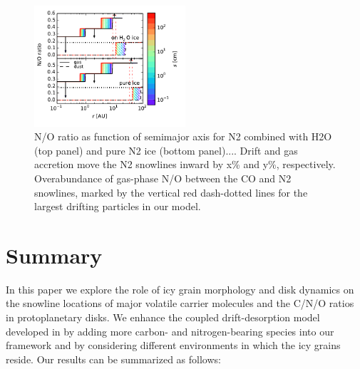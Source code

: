 \documentclass[apj]{emulateapj}
\newcommand{\emgr}[1]{\emph{ \color{gray} #1}}
\begin{document}
\begin{figure}[h!]
\centering
\includegraphics[width=0.5\textwidth]{../../figs/N_O_water_ice.pdf}
\caption{N/O ratio as function of semimajor axis for N2 combined with H2O (top panel) and pure N2 ice (bottom panel).... Drift and gas accretion move the N2 snowlines inward by x\% and y\%, respectively. Overabundance of gas-phase N/O between the CO and N2 snowlines, marked by the vertical red dash-dotted lines for the largest drifting particles in our model.} 
\label{fig:NO_ratio}
\end{figure}



\section{Summary}

In this paper we explore the role of icy grain morphology and disk dynamics on the snowline locations of major volatile carrier molecules and the C/N/O ratios in protoplanetary disks. We enhance the coupled drift-desorption model developed in \citet{piso15b} by adding more carbon- and nitrogen-bearing species into our framework and by considering different environments in which the icy grains reside. Our results can be summarized as follows:
\end{document}
